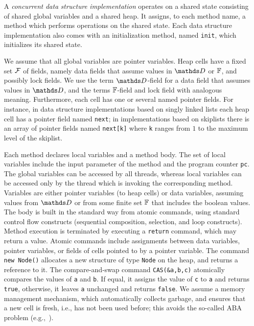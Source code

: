 A {\em concurrent data structure implementation} operates on a shared
state consisting of shared global variables and a shared heap.
It assigns, to each method name, a method which performs operations
%
on the shared state.
Each data structure implementation also comes with an initialization method,
named {\tt init}, which initializes its shared state.

We assume that all global variables are pointer variables.
Heap cells have a fixed set $\mathcal{F}$ of fields, namely
data fields that assume values in
$\ddomain$ or $\mathbb{F}$, and possibly lock fields.
We use the term $\ddomain$-field for a data field that
assumes values in $\ddomain$, and the terms $\mathbb{F}$-field and lock field
with analogous meaning.
Furthermore, each cell has one or several named pointer fields.
For instance, in data structure implementations based on singly linked lists
each heap cell has a pointer field named {\tt next}; in implementations
based on skiplists there is an array of pointer fields named
{\tt next[k]} where {\tt k} ranges from $1$ to the maximum level of the
skiplist.

%
Each method declares local variables and a method body.
%
The set of local variables include the input parameter of the method and
the program counter {\tt pc}.
The global variables can be
accessed by all threads, whereas local variables can be accessed only
by the thread which is invoking the corresponding method.
Variables are either pointer variables (to heap cells) or data variables, assuming values from $\ddomain$ or from some finite set $\mathbb{F}$ that includes the boolean values.
%
%
%
The body is built in the standard way
from atomic commands, using standard control
flow constructs (sequential composition, selection, and loop constructs).
%
%
%
Method execution is terminated by executing a {\tt return} command,
which may return a value.
%
Atomic commands include assignments between data variables, 
pointer variables, or fields of cells pointed to by a pointer variable.
%
The command {\tt new Node()} allocates a new structure of type
{\tt Node} on the heap, and returns a reference to it.
%
The compare-and-swap command {\tt CAS(\&a,b,c)} atomically
compares the values of {\tt a} and {\tt b}.
If  equal, it assigns the value of
{\tt c} to {\tt a}  and returns {\tt true}, 
otherwise, it leaves {\tt a} unchanged and returns {\tt false}. 
%
We assume a memory management mechanism, which automatically collects
garbage, and ensures that a new cell is fresh, i.e., has
not been used before; this avoids the so-called
ABA problem (e.g.,~\cite{MS:QueueAlgorithms}).

